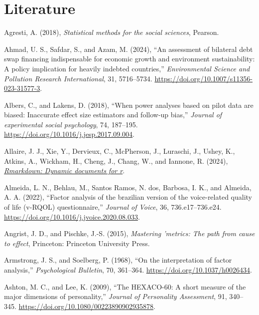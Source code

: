 \documentclass[
  10pt,
  a4paper,
  twoside]{article}
\newlength{\cslhangindent}
\newenvironment{CSLReferences}[2] %
 {\begin{list}{}{%
  \setlength{\itemindent}{0pt}
  \setlength{\leftmargin}{0pt}
  \setlength{\parsep}{0pt}
  \ifodd #1
   \setlength{\leftmargin}{\cslhangindent}
   \setlength{\itemindent}{-1\cslhangindent}
  \fi
  \setlength{\itemsep}{#2\baselineskip}}}
 {\end{list}}
\begin{document}
\section{Literature}\label{sec:sec_literature}

\label{refs}
\begin{CSLReferences}{1}{0}
Agresti, A. (2018), \emph{Statistical methods for the social sciences}, Pearson.

Ahmad, U. S., Safdar, S., and Azam, M. (2024), {``An assessment of bilateral debt swap financing indispensable for economic growth and environment sustainability: A policy implication for heavily indebted countries,''} \emph{Environmental Science and Pollution Research International}, 31, 5716--5734. \url{https://doi.org/10.1007/s11356-023-31577-3}.

Albers, C., and Lakens, D. (2018), {``When power analyses based on pilot data are biased: Inaccurate effect size estimators and follow-up bias,''} \emph{Journal of experimental social psychology}, 74, 187--195. \url{https://doi.org/10.1016/j.jesp.2017.09.004}.

Allaire, J. J., Xie, Y., Dervieux, C., McPherson, J., Luraschi, J., Ushey, K., Atkins, A., Wickham, H., Cheng, J., Chang, W., and Iannone, R. (2024), \emph{\href{https://github.com/rstudio/rmarkdown}{Rmarkdown: Dynamic documents for r}}.

Almeida, L. N., Behlau, M., Santos Ramos, N. dos, Barbosa, I. K., and Almeida, A. A. (2022), {``Factor analysis of the brazilian version of the voice-related quality of life (v-RQOL) questionnaire,''} \emph{Journal of Voice}, 36, 736.e17--736.e24. \url{https://doi.org/10.1016/j.jvoice.2020.08.033}.

Angrist, J. D., and Pischke, J.-S. (2015), \emph{Mastering 'metrics: The path from cause to effect}, Princeton: Princeton University Press.

Armstrong, J. S., and Soelberg, P. (1968), {``On the interpretation of factor analysis,''} \emph{Psychological Bulletin}, 70, 361--364. \url{https://doi.org/10.1037/h0026434}.

Ashton, M. C., and Lee, K. (2009), {``The HEXACO-60: A short measure of the major dimensions of personality,''} \emph{Journal of Personality Assessment}, 91, 340--345. \url{https://doi.org/10.1080/00223890902935878}.


\end{CSLReferences}
\end{document}

